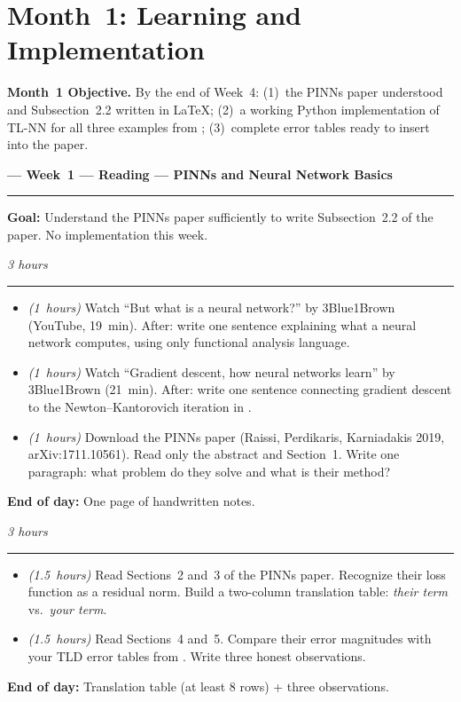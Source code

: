 \documentclass[12pt,a4paper]{article}
\newcommand{\hrs}[1]{\textit{\color{darkgray}(#1~hours)}}
\newcommand{\weekheading}[2]{%
  \vspace{0.8em}
  \noindent
  {\large\bfseries\color{midblue}--- Week~#1 ---
  \hfill\normalsize\normalfont\color{darkgray}#2}
  \vspace{0.2em}
  \\{\color{midblue}\rule{\linewidth}{0.6pt}}
  \vspace{0.3em}
}
\newcommand{\dayheading}[2]{%
  \vspace{0.3em}
  \noindent{\bfseries\color{darkblue}Day~#1}%
  \hfill{\small\color{darkgray}\textit{#2}}%
  \\[-0.4em]{\color{midgray}\rule{\linewidth}{0.4pt}}%
  \vspace{0.1em}
}
\begin{document}
\newpage
\section{Month~1: Learning and Implementation}

\begin{tcolorbox}[infostyle]
\noindent\textbf{Month~1 Objective.}
By the end of Week~4:
(1)~the PINNs paper understood and Subsection~2.2 written
in \LaTeX;
(2)~a working Python implementation of TL-NN for all three
examples from \cite{sedka2025};
(3)~complete error tables ready to insert into the paper.
\end{tcolorbox}

\weekheading{1}{Reading --- PINNs and Neural Network Basics}

\noindent\textbf{Goal:}
Understand the PINNs paper sufficiently to write
Subsection~2.2 of the paper. No implementation this week.

\vspace{0.5em}

\begin{tcolorbox}[daystyle]
\dayheading{1}{3 hours}
\begin{itemize}[leftmargin=1.8em,itemsep=3pt]
  \item[\color{midblue}$\bullet$]
    \hrs{1} Watch ``But what is a neural network?''
    by 3Blue1Brown (YouTube, 19~min). After: write one
    sentence explaining what a neural network computes,
    using only functional analysis language.
  \item[\color{midblue}$\bullet$]
    \hrs{1} Watch ``Gradient descent, how neural networks
    learn'' by 3Blue1Brown (21~min). After: write one
    sentence connecting gradient descent to the
    Newton--Kantorovich iteration in \cite{sedka2025}.
  \item[\color{midblue}$\bullet$]
    \hrs{1} Download the PINNs paper (Raissi, Perdikaris,
    Karniadakis 2019, arXiv:1711.10561). Read only the
    abstract and Section~1. Write one paragraph: what
    problem do they solve and what is their method?
\end{itemize}
\noindent\textbf{End of day:} One page of handwritten notes.
\end{tcolorbox}

\begin{tcolorbox}[daystyle]
\dayheading{2}{3 hours}
\begin{itemize}[leftmargin=1.8em,itemsep=3pt]
  \item[\color{midblue}$\bullet$]
    \hrs{1.5} Read Sections~2 and~3 of the PINNs paper.
    Recognize their loss function as a residual norm.
    Build a two-column translation table:
    \textit{their term} vs.\ \textit{your term}.
  \item[\color{midblue}$\bullet$]
    \hrs{1.5} Read Sections~4 and~5. Compare their error
    magnitudes with your TLD error tables from
    \cite{sedka2025}. Write three honest observations.
\end{itemize}
\noindent\textbf{End of day:}
Translation table (at least 8 rows) + three observations.
\end{tcolorbox}
\end{document}
